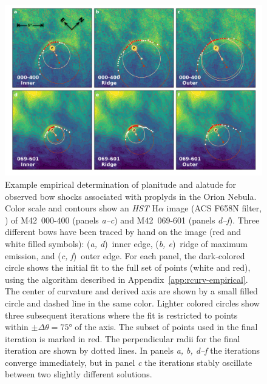 \begin{figure}
  \centering
  \includegraphics[width=\linewidth]{figs/new-two-arc-multi-fig}
  \caption[]{Example empirical determination of planitude and alatude
    for observed bow shocks associated with proplyds in the Orion
    Nebula.  Color scale and contours show an \textit{HST} H\(\alpha\)
    image (ACS F658N filter, \citealp{Bally:2006a}) of M42~000-400
    (panels \textit{a--c}) and M42~069-601 (panels \textit{d--f}). Three
    different bows have been traced by hand on the image (red and
    white filled symbols): (\textit{a, d})~inner edge, (\textit{b,
      e})~ridge of maximum emission, and (\textit{c, f})~outer edge.
    For each panel, the dark-colored circle shows the initial fit to
    the full set of points (white and red), using the algorithm
    described in Appendix~\ref{app:rcurv-empirical}.  The center of
    curvature and derived axis are shown by a small filled circle and
    dashed line in the same color. Lighter colored circles show three
    subsequent iterations where the fit is restricted to points within
    \(\pm \Delta\theta = \ang{75}\) of the axis.  The subset of points used in
    the final iteration is marked in red.  The perpendicular radii for
    the final iteration are shown by dotted lines. In panels
    \textit{a, b, d--f} the iterations converge immediately, but in
    panel \textit{c} the iterations stably oscillate between two
    slightly different solutions. }
  \label{fig:000-400-fit}
\end{figure}

